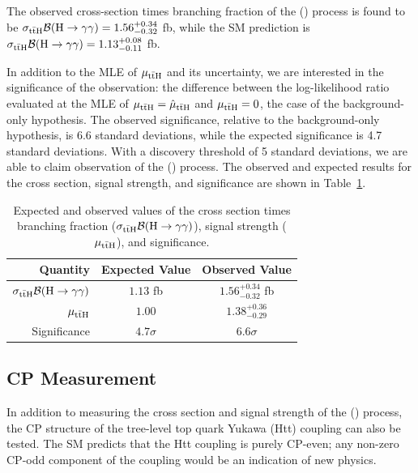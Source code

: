 The observed cross-section times branching fraction of the \ttH (\Hgg) process is found to be $\sigma_{\mathrm{t\bar{t}H}} \mathcal B(\text{H} \to \gamma \gamma) = 1.56^{+0.34}_{-0.32}$ fb, while the SM prediction is $\sigma_{\mathrm{t\bar{t}H}} \mathcal B(\text{H} \to \gamma \gamma) = 1.13^{+0.08}_{-0.11}$ fb.

In addition to the MLE of $\mu_{\mathrm{t\bar{t}H}}$ and its uncertainty, we are interested in the significance of the observation: the difference between the log-likelihood ratio evaluated at the MLE of $\mu_{\mathrm{t\bar{t}H}} = \hat{\mu}_{\mathrm{t\bar{t}H}}$ and $\mu_{\mathrm{t\bar{t}H}} = 0$, the case of the background-only hypothesis.
The observed significance, relative to the background-only hypothesis, is 6.6 standard deviations, while the expected significance is 4.7 standard deviations.
With a discovery threshold of 5 standard deviations, we are able to claim observation of the \ttH (\Hgg) process.
The observed and expected results for the cross section, signal strength, and significance are shown in Table~\ref{tab:tth_results}.
\begin{table} [htbp!]
    \centering
    \caption{Expected and observed values of the cross section times branching fraction ($\sigma_{\mathrm{t\bar{t}H}} \mathcal B(\text{H} \to \gamma \gamma)$), signal strength ($\mu_{\mathrm{t\bar{t}H}}$), and significance.}
    \begin{tabular}{r c c} \hline \hline
        Quantity & Expected Value & Observed Value \\ \hline
        $\sigma_{\mathrm{t\bar{t}H}} \mathcal B(\text{H} \to \gamma \gamma)$ & $1.13$ fb & $1.56^{+0.34}_{-0.32}$ fb \\
        $\mu_{\mathrm{t\bar{t}H}}$ & $1.00$ & $1.38^{+0.36}_{-0.29}$ \\
        Significance & $4.7\sigma$ & $6.6\sigma$ \\ \hline \hline
    \end{tabular}
    \label{tab:tth_results}
\end{table}

\subsection{CP Measurement}
In addition to measuring the cross section and signal strength of the \ttH (\Hgg) process, the CP structure of the tree-level top quark Yukawa (Htt) coupling can also be tested.
The SM predicts that the Htt coupling is purely CP-even; any non-zero CP-odd component of the coupling would be an indication of new physics.

